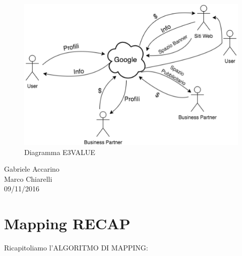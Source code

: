 \begin{itemize}
\begin{center}
\begin{figure}[H]
\centering
\includegraphics[scale=1]{figures/e3value.png}
\caption{Diagramma E3VALUE} 
\end{figure}
\end{center}

\end{itemize}


\begin{flushright}Gabriele Accarino\\Marco Chiarelli\\09/11/2016\end{flushright}


\section{Mapping RECAP}

Ricapitoliamo l’ALGORITMO DI MAPPING:  

